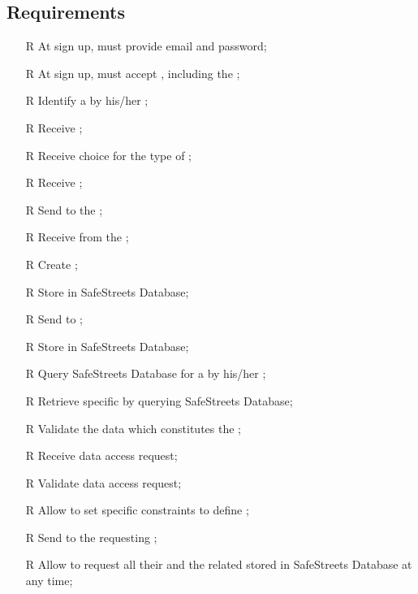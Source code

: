 \documentclass[../../../rasd.tex]{subfiles}
\begin{document}
\subsection{Requirements\label{sect:3.2.5}}
\begin{itemize}
	
	\item[R\subs{1}]At sign up,  must provide email and password;
	\item[R\subs{2}]At sign up,  must accept , including the ;
	\item[R\subs{3}]Identify a  by his/her ;
	\item[R\subs{4}]Receive ;
	\item[R\subs{5}]Receive  choice for the type of ;
	\item[R\subs{6}]Receive ;
	\item[R\subs{7}]Send  to the ;
	\item[R\subs{8}]Receive  from the ;
	\item[R\subs{9}]Create ;
	\item[R\subs{10}]Store  in SafeStreets Database;
	\item[R\subs{11}]Send  to ;
	\item[R\subs{12}]Store  in SafeStreets Database;
	\item[R\subs{13}]Query SafeStreets Database for a  by his/her ;
	\item[R\subs{14}]Retrieve specific  by querying SafeStreets Database;
	\item[R\subs{15}]Validate the data which constitutes the ;
	\item[R\subs{16}]Receive  data access request;
	\item[R\subs{17}]Validate  data access request;
	\item[R\subs{18}]Allow  to set specific constraints to define ;
	\item[R\subs{19}]Send  to the requesting ;
	\item[R\subs{20}]Allow  to request all their  and the related  stored in SafeStreets Database at any time;

\end{itemize}
\end{document}
